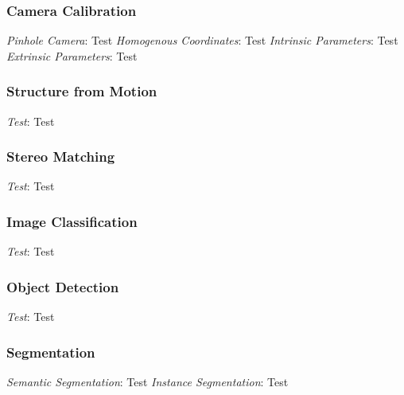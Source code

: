 \documentclass{article}
\author{Ian Chen}
\date{\today}
\begin{document}
    \begin{multicols*}{2}
        \subsubsection*{Camera Calibration}
        \textit{Pinhole Camera}: Test\newline
        \textit{Homogenous Coordinates}: Test\newline
        \textit{Intrinsic Parameters}: Test\newline
        \textit{Extrinsic Parameters}: Test\newline
        \subsubsection*{Structure from Motion}
        \textit{Test}: Test\newline
        \subsubsection*{Stereo Matching}
        \textit{Test}: Test\newline
        \subsubsection*{Image Classification}
        \textit{Test}: Test\newline
        \subsubsection*{Object Detection}
        \textit{Test}: Test\newline
        \subsubsection*{Segmentation}
        \textit{Semantic Segmentation}: Test\newline
        \textit{Instance Segmentation}: Test\newline
    \end{multicols*}
\end{document}
